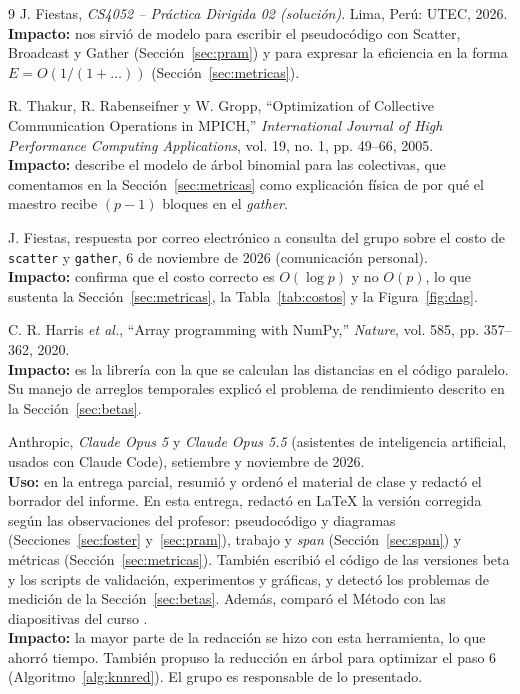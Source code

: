 \documentclass[11pt,a4paper]{article}
\begin{document}
\begin{thebibliography}{9}
 J. Fiestas, \textit{CS4052 -- Práctica Dirigida 02 (solución)}. Lima, Perú: UTEC, 2026.\\
\textbf{Impacto:} nos sirvió de modelo para escribir el pseudocódigo con Scatter, Broadcast y Gather (Sección~\ref{sec:pram}) y para expresar la eficiencia en la forma $E=O(1/(1+\dots))$ (Sección~\ref{sec:metricas}).

 R. Thakur, R. Rabenseifner y W. Gropp, ``Optimization of Collective Communication Operations in MPICH,'' \textit{International Journal of High Performance Computing Applications}, vol. 19, no. 1, pp. 49--66, 2005.\\
\textbf{Impacto:} describe el modelo de árbol binomial para las colectivas, que comentamos en la Sección~\ref{sec:metricas} como explicación física de por qué el maestro recibe $(p-1)$ bloques en el \textit{gather}.

 J. Fiestas, respuesta por correo electrónico a consulta del grupo sobre el costo de \texttt{scatter} y \texttt{gather}, 6 de noviembre de 2026 (comunicación personal).\\
\textbf{Impacto:} confirma que el costo correcto es $O(\log p)$ y no $O(p)$, lo que sustenta la Sección~\ref{sec:metricas}, la Tabla~\ref{tab:costos} y la Figura~\ref{fig:dag}.

 C. R. Harris \textit{et al.}, ``Array programming with NumPy,'' \textit{Nature}, vol. 585, pp. 357--362, 2020.\\
\textbf{Impacto:} es la librería con la que se calculan las distancias en el código paralelo. Su manejo de arreglos temporales explicó el problema de rendimiento descrito en la Sección~\ref{sec:betas}.

 Anthropic, \textit{Claude Opus 5} y \textit{Claude Opus 5.5} (asistentes de inteligencia artificial, usados con Claude Code), setiembre y noviembre de 2026.\\
\textbf{Uso:} en la entrega parcial, resumió y ordenó el material de clase y redactó el borrador del informe. En esta entrega, redactó en LaTeX la versión corregida según las observaciones del profesor: pseudocódigo y diagramas (Secciones~\ref{sec:foster} y~\ref{sec:pram}), trabajo y \textit{span} (Sección~\ref{sec:span}) y métricas (Sección~\ref{sec:metricas}). También escribió el código de las versiones beta y los scripts de validación, experimentos y gráficas, y detectó los problemas de medición de la Sección~\ref{sec:betas}. Además, comparó el Método con las diapositivas del curso \cite{slides}.\\
\textbf{Impacto:} la mayor parte de la redacción se hizo con esta herramienta, lo que ahorró tiempo. También propuso la reducción en árbol para optimizar el paso 6 (Algoritmo~\ref{alg:knnred}). El grupo es responsable de lo presentado.

\end{thebibliography}
\end{document}
